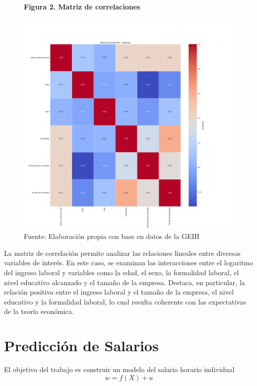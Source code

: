 \documentclass[11pt, a4paper]{article}
\begin{document}
\begin{figure}[H]
    \centering
	\caption*{\textbf{Figura 2. Matriz de correlaciones}}
	\captionsetup{justification=centering}
	\includegraphics[width=16cm]{../Views/grafico2.png}
	\caption*{\small Fuente: Elaboración propia con base en datos de la GEIH }
\end{figure}

La matriz de correlación permite analizar las relaciones lineales entre diversas variables de interés. En este caso, se examinan las interacciones entre el logaritmo del ingreso laboral y variables como la edad, el sexo, la formalidad laboral, el nivel educativo alcanzado y el tamaño de la empresa. Destaca, en particular, la relación positiva entre el ingreso laboral y el tamaño de la empresa, el nivel educativo y la formalidad laboral, lo cual resulta coherente con las expectativas de la teoría económica. 


\section{Predicción de Salarios}

El objetivo del trabajo es construir un modelo del salario horario individual 
\begin{equation*}
w=f(X) + u  
\end{equation*}
\end{document}
